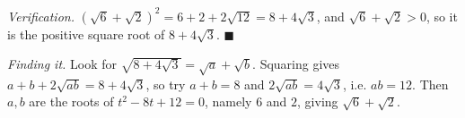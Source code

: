 \emph{Verification.} $\left(\sqrt6+\sqrt2\right)^2=6+2+2\sqrt{12}=8+4\sqrt3$, and $\sqrt6+\sqrt2>0$, so it is the positive square root of $8+4\sqrt3$. $\blacksquare$

\emph{Finding it.} Look for $\sqrt{8+4\sqrt3}=\sqrt a+\sqrt b$. Squaring gives $a+b+2\sqrt{ab}=8+4\sqrt3$, so try $a+b=8$ and $2\sqrt{ab}=4\sqrt3$, i.e. $ab=12$. Then $a,b$ are the roots of $t^2-8t+12=0$, namely $6$ and $2$, giving $\boxed{\sqrt6+\sqrt2}$.

